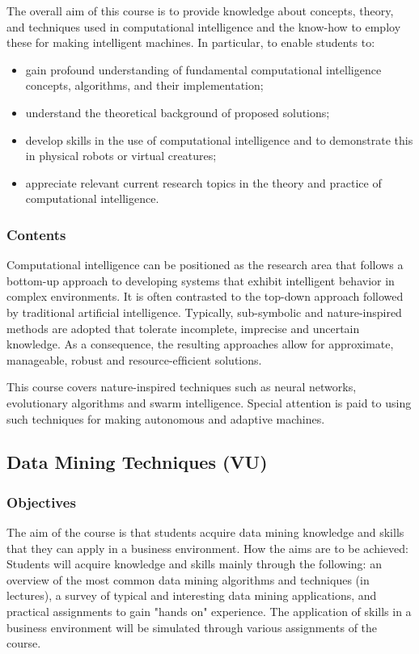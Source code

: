 \documentclass[11pt]{article}
\begin{document}
The overall aim of this course is to provide knowledge about concepts, theory,
and techniques used in computational intelligence and the know-how to employ
these for making intelligent machines. In particular, to enable students to:
\begin{itemize}
\item gain profound understanding of fundamental computational intelligence
concepts, algorithms, and their implementation;
\item understand the theoretical background of proposed solutions;
\item develop skills in the use of computational intelligence and to demonstrate
this in physical robots or virtual creatures;
\item appreciate relevant current research topics in the theory and practice of
computational intelligence.
\end{itemize}

\subsubsection{Contents}
\label{sec:org2ea9aa5}

Computational intelligence can be positioned as the research area that follows a
bottom-up approach to developing systems that exhibit intelligent behavior in
complex environments. It is often contrasted to the top-down approach followed
by traditional artificial intelligence. Typically, sub-symbolic and
nature-inspired methods are adopted that tolerate incomplete, imprecise and
uncertain knowledge. As a consequence, the resulting approaches allow for
approximate, manageable, robust and resource-efﬁcient solutions.

This course covers nature-inspired techniques such as neural networks,
evolutionary algorithms and swarm intelligence. Special attention is paid to
using such techniques for making autonomous and adaptive machines.

\subsection{Data Mining Techniques (VU)}
\label{sec:orgf877fa8}

\subsubsection{Objectives}
\label{sec:org31972c3}

The aim of the course is that students acquire data mining knowledge and skills
that they can apply in a business environment. How the aims are to be achieved:
Students will acquire knowledge and skills mainly through the following: an
overview of the most common data mining algorithms and techniques (in lectures),
a survey of typical and interesting data mining applications, and practical
assignments to gain "hands on" experience. The application of skills in a
business environment will be simulated through various assignments of the
course.
\end{document}
